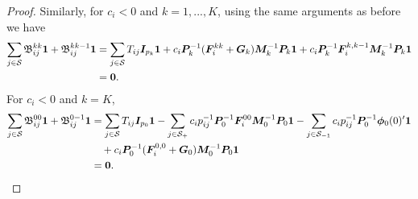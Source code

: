 \begin{proof}
		Similarly, for \(c_i<0\) and \(k=1,...,K\), using the same arguments as before we have
	\begin{align*}
		\sum_{j\in\mathcal{S}}\mathfrak{\boldsymbol B}^{kk}_{ij}\boldsymbol 1 + \mathfrak{\boldsymbol B}^{kk-1}_{ij}\boldsymbol 1
		&=\sum_{j\in\mathcal{S}}T_{ij}\boldsymbol I_{p_k}\boldsymbol 1 + c_i \boldsymbol P_k^{-1}(\boldsymbol F_i^{kk}+\boldsymbol G_k)\boldsymbol M_k^{-1}\boldsymbol P_k\boldsymbol 1 + c_i \boldsymbol P_k^{-1}\boldsymbol F_i^{k,k-1}\boldsymbol M_k^{-1}\boldsymbol P_k\boldsymbol 1
		\\&= \boldsymbol 0.
	\end{align*}
	For \(c_i<0\) and \(k=K\), 
	\begin{align*}
		\sum_{j\in\mathcal{S}}\mathfrak{\boldsymbol B}^{00}_{ij}\boldsymbol 1 + \mathfrak{\boldsymbol B}^{0{-1}}_{ij}\boldsymbol 1
		&= \sum_{j\in\mathcal{S}}T_{ij}\boldsymbol I_{p_0}\boldsymbol 1-\sum_{j\in\mathcal{S}_+} c_ip_{ij}^{-1} \boldsymbol P_0^{-1}\boldsymbol F_i^{00}\boldsymbol M_0^{-1}\boldsymbol P_0 \boldsymbol 1 -\sum_{j\in\mathcal{S}_{{-1} }}c_ip_{ij}^{-1} \boldsymbol P_0^{-1}\boldsymbol \phi_0(0)'{}\boldsymbol 1 
		\\&\quad{} + c_i \boldsymbol P_0^{-1}(\boldsymbol F_i^{0,0}+\boldsymbol G_0)\boldsymbol M_0^{-1}\boldsymbol P_0\boldsymbol 1 
		\\&= \boldsymbol 0.
	\end{align*}


\end{proof}
